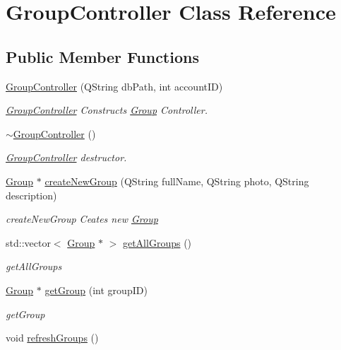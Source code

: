\hypertarget{classGroupController}{}\section{Group\+Controller Class Reference}
\label{classGroupController}
\subsection*{Public Member Functions}
\begin{DoxyCompactItemize}
\item 
\hyperlink{classGroupController_ae547a242eca65a1605d9c53af638fcfe}{Group\+Controller} (Q\+String db\+Path, int account\+ID)
\begin{DoxyCompactList}\small\item\em \hyperlink{classGroupController}{Group\+Controller} Constructs \hyperlink{classGroup}{Group} Controller. \end{DoxyCompactList}\item 
\hyperlink{classGroupController_ae3e63080f1b8ffff1dd2e3fa10a0819a}{$\sim$\+Group\+Controller} ()\hypertarget{classGroupController_ae3e63080f1b8ffff1dd2e3fa10a0819a}{}\label{classGroupController_ae3e63080f1b8ffff1dd2e3fa10a0819a}

\begin{DoxyCompactList}\small\item\em \hyperlink{classGroupController}{Group\+Controller} destructor. \end{DoxyCompactList}\item 
\hyperlink{classGroup}{Group} $\ast$ \hyperlink{classGroupController_a751f2b1a4214f7def0d2f3d1816260d3}{create\+New\+Group} (Q\+String full\+Name, Q\+String photo, Q\+String description)
\begin{DoxyCompactList}\small\item\em create\+New\+Group Ceates new \hyperlink{classGroup}{Group} \end{DoxyCompactList}\item 
std\+::vector$<$ \hyperlink{classGroup}{Group} $\ast$ $>$ \hyperlink{classGroupController_a251a65c5639370e8e5740f872f2b3837}{get\+All\+Groups} ()
\begin{DoxyCompactList}\small\item\em get\+All\+Groups \end{DoxyCompactList}\item 
\hyperlink{classGroup}{Group} $\ast$ \hyperlink{classGroupController_a4f65aad9b4e4595d8272fed4b6f8a262}{get\+Group} (int group\+ID)
\begin{DoxyCompactList}\small\item\em get\+Group \end{DoxyCompactList}\item 
void \hyperlink{classGroupController_a7a52522600b09950c9e2fb6b1e6b2154}{refresh\+Groups} ()\hypertarget{classGroupController_a7a52522600b09950c9e2fb6b1e6b2154}{}\label{classGroupController_a7a52522600b09950c9e2fb6b1e6b2154}


\end{DoxyCompactItemize}
